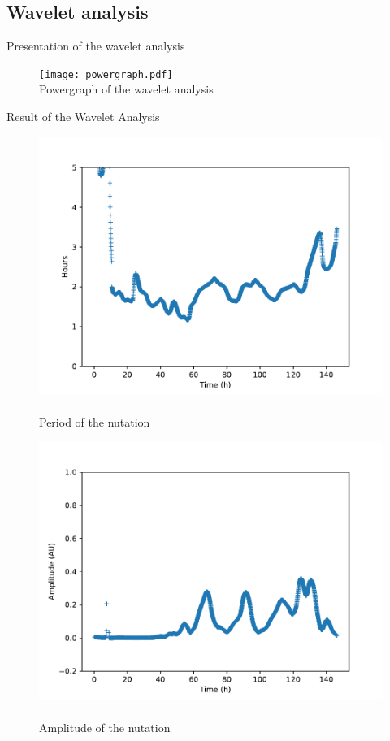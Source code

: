 \documentclass[12pt]{beamer}
\begin{document}
\subsection{Wavelet analysis}
\begin{frame}{Presentation of the wavelet analysis}

\begin{figure}

\texttt{[image: powergraph.pdf]}~\\
Powergraph of the wavelet analysis
\end{figure}

\end{frame}

\begin{frame}{Result of the Wavelet Analysis}
\begin{multicols}{2}
\begin{figure}
\includegraphics[width = \linewidth]{period.pdf}~\\
Period of the nutation
\end{figure}
\begin{figure}
\includegraphics[width = \linewidth]{ampl.pdf}~\\
Amplitude of the nutation
\end{figure}
\end{multicols}
\end{frame}
\end{document}
